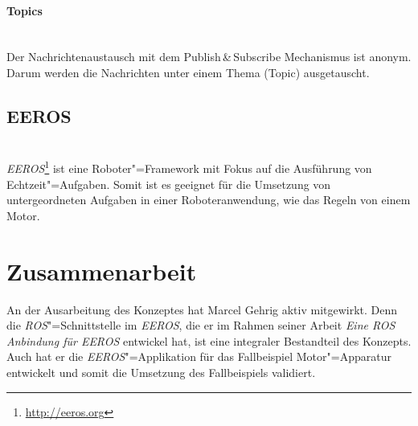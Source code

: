 \paragraph*{Topics} \mbox{}\\
Der Nachrichtenaustausch mit dem Publish\,\&\,Subscribe Mechanismus ist anonym.
Darum werden die Nachrichten unter einem Thema (Topic) ausgetauscht.

\subsection{EEROS} \mbox{}\\
\textit{EEROS}\footnote{\url{http://eeros.org}} ist eine Roboter"=Framework mit Fokus auf die Ausführung von Echtzeit"=Aufgaben.
Somit ist es geeignet für die Umsetzung von untergeordneten Aufgaben in einer Roboteranwendung, wie das Regeln von einem Motor.


\section{Zusammenarbeit}
An der Ausarbeitung des Konzeptes hat Marcel Gehrig aktiv mitgewirkt.
Denn die \textit{ROS}"=Schnittstelle im \textit{EEROS}, die er im Rahmen seiner Arbeit \textit{Eine ROS Anbindung für EEROS} entwickel hat, ist eine integraler Bestandteil des Konzepts.
Auch hat er die \textit{EEROS}"=Applikation für das Fallbeispiel Motor"=Apparatur entwickelt und somit die Umsetzung des Fallbeispiels validiert.
